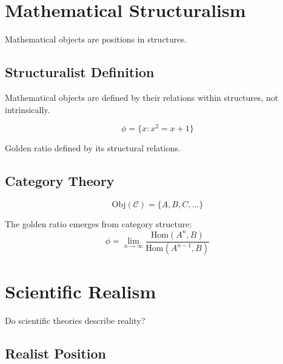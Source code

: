 \section{Mathematical Structuralism}

Mathematical objects are positions in structures.

\subsection{Structuralist Definition}

\begin{definition}[Structuralism]
\label{fa_31:def:structuralism}
Mathematical objects are defined by their relations within structures, not intrinsically.
\end{definition}

\begin{theorem}
\label{fa_31:thm:golden-struct}
\begin{equation}
\phi = \{x : x^2 = x + 1\}
\end{equation}

Golden ratio defined by its structural relations.
\end{theorem}

\subsection{Category Theory}

\begin{equation}
\text{Obj}(\mathcal{C}) = \{A, B, C, \ldots\}
\end{equation}

\begin{proposition}
\label{fa_31:prop:golden-cat}
The golden ratio emerges from category structure:
\begin{equation}
\phi = \lim_{n\to\infty} \frac{\text{Hom}(A^n, B)}{\text{Hom}(A^{n-1}, B)}
\end{equation}

\end{proposition}

\section{Scientific Realism}

Do scientific theories describe reality?

\subsection{Realist Position}

